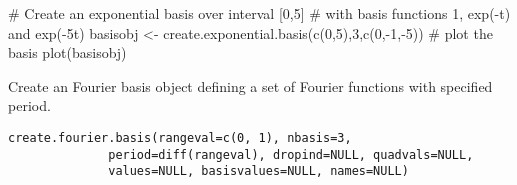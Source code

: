 \documentclass{article}
\begin{document}
\begin{Examples}
\begin{ExampleCode}

#  Create an exponential basis over interval [0,5]
#  with basis functions 1, exp(-t) and exp(-5t)
basisobj <- create.exponential.basis(c(0,5),3,c(0,-1,-5))
#  plot the basis
plot(basisobj)

\end{ExampleCode}
\end{Examples}

\begin{Description}\relax
Create an Fourier basis object defining a set of Fourier
functions with specified period.
\end{Description}
\begin{Usage}
\begin{verbatim}
create.fourier.basis(rangeval=c(0, 1), nbasis=3,
              period=diff(rangeval), dropind=NULL, quadvals=NULL,
              values=NULL, basisvalues=NULL, names=NULL)
\end{verbatim}
\end{Usage}
\end{document}
